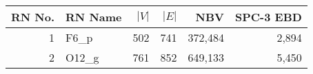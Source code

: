 \begin{tabular}{rlrrrr}
\toprule
RN No. & RN Name & $|V|$ & $|E|$ & NBV & SPC-3 EBD \\
\midrule
1 & F6\_p & 502 & 741 & 372,484 & 2,894 \\
2 & O12\_g & 761 & 852 & 649,133 & 5,450 \\
\bottomrule
\end{tabular}
